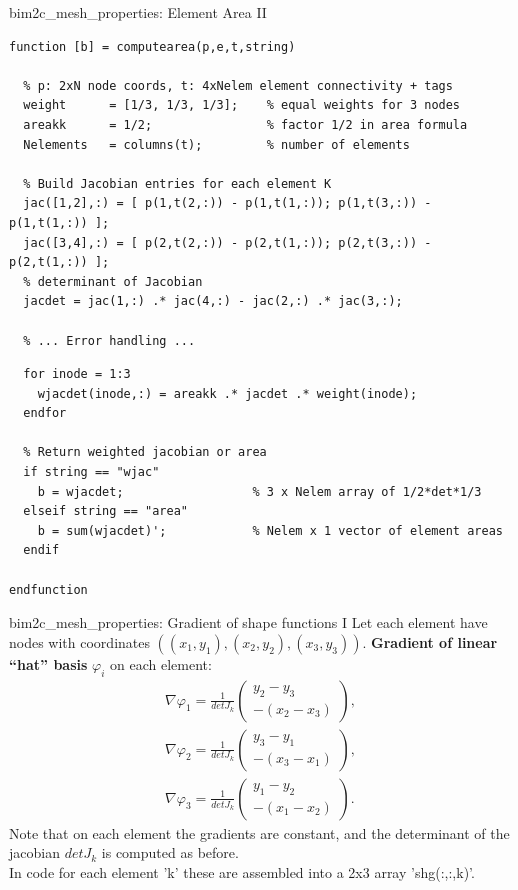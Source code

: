 \documentclass[aspectratio=54,xcolor=dvipsnames]{beamer}
\begin{document}
\begin{frame}[fragile]{bim2c\_mesh\_properties: Element Area II}
\scriptsize
\begin{lstlisting}[firstnumber=374]
function [b] = computearea(p,e,t,string)

  % p: 2xN node coords, t: 4xNelem element connectivity + tags
  weight      = [1/3, 1/3, 1/3];    % equal weights for 3 nodes
  areakk      = 1/2;                % factor 1/2 in area formula
  Nelements   = columns(t);         % number of elements
  
  % Build Jacobian entries for each element K
  jac([1,2],:) = [ p(1,t(2,:)) - p(1,t(1,:)); p(1,t(3,:)) - p(1,t(1,:)) ];
  jac([3,4],:) = [ p(2,t(2,:)) - p(2,t(1,:)); p(2,t(3,:)) - p(2,t(1,:)) ];
  % determinant of Jacobian
  jacdet = jac(1,:) .* jac(4,:) - jac(2,:) .* jac(3,:);   
  
  % ... Error handling ...
\end{lstlisting}
\begin{lstlisting}[firstnumber=400]
  % Weighted jacobian for each local node i
  for inode = 1:3
    wjacdet(inode,:) = areakk .* jacdet .* weight(inode);
  endfor
  
  % Return weighted jacobian or area
  if string == "wjac"
    b = wjacdet;                  % 3 x Nelem array of 1/2*det*1/3
  elseif string == "area"
    b = sum(wjacdet)';            % Nelem x 1 vector of element areas
  endif

endfunction
\end{lstlisting}
\end{frame}

\begin{frame}{bim2c\_mesh\_properties: Gradient of shape functions I}
\small
Let each element have nodes with coordinates $((x_1,y_1), (x_2,y_2), (x_3,y_3))$.
\textbf{Gradient of linear “hat” basis} \(\varphi_i\) on each element:
\begin{align*}
    \nabla\varphi_1 = \frac{1}{det J_k}
        \begin{pmatrix} y_2 - y_3 \\[3pt] -(x_2 - x_3) \end{pmatrix},
    \\
    \nabla\varphi_2 = \frac{1}{det J_k}
        \begin{pmatrix} y_3 - y_1 \\[3pt] -(x_3 - x_1) \end{pmatrix},
    \\
    \nabla\varphi_3 = \frac{1}{det J_k}
        \begin{pmatrix} y_1 - y_2 \\[3pt] -(x_1 - x_2) \end{pmatrix}.
\end{align*}
Note that on each element the gradients are constant, and the determinant of the jacobian $det J_k$ is computed as before. \\
In code for each element 'k' these are assembled into a 2x3 array 'shg(:,:,k)'.
\end{frame}
\end{document}
